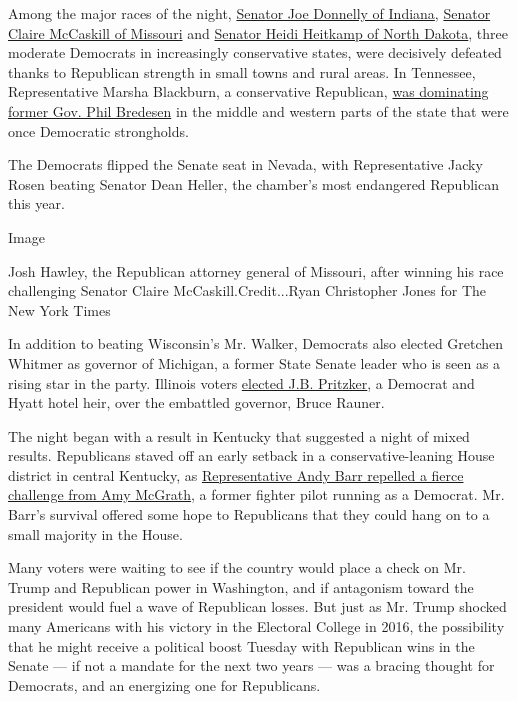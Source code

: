 Among the major races of the night,
\href{https://www.nytimes.com/elections/results/indiana-senate}{Senator
Joe Donnelly of Indiana},
\href{https://www.nytimes.com/2018/11/06/us/politics/josh-hawley-claire-mccaskill-missouri.html}{Senator
Claire McCaskill of Missouri} and
\href{https://www.nytimes.com/2018/11/06/us/politics/heidi-heitkamp-kevin-cramer-north-dakota.html}{Senator
Heidi Heitkamp of North Dakota}, three moderate Democrats in
increasingly conservative states, were decisively defeated thanks to
Republican strength in small towns and rural areas. In Tennessee,
Representative Marsha Blackburn, a conservative Republican,
\href{https://www.nytimes.com/elections/results/tennessee-senate}{was
dominating former Gov. Phil Bredesen} in the middle and western parts of
the state that were once Democratic strongholds.

The Democrats flipped the Senate seat in Nevada, with Representative
Jacky Rosen beating Senator Dean Heller, the chamber's most endangered
Republican this year.

Image

Josh Hawley, the Republican attorney general of Missouri, after winning
his race challenging Senator Claire McCaskill.Credit...Ryan Christopher
Jones for The New York Times

In addition to beating Wisconsin's Mr. Walker, Democrats also elected
Gretchen Whitmer as governor of Michigan, a former State Senate leader
who is seen as a rising star in the party. Illinois voters
\href{https://www.nytimes.com/elections/results/illinois-governor}{elected
J.B. Pritzker}, a Democrat and Hyatt hotel heir, over the embattled
governor, Bruce Rauner.

The night began with a result in Kentucky that suggested a night of
mixed results. Republicans staved off an early setback in a
conservative-leaning House district in central Kentucky, as
\href{https://www.nytimes.com/2018/11/06/us/politics/andy-barr-amy-mcgrath-kentucky.html}{Representative
Andy Barr repelled a fierce challenge from Amy McGrath}, a former
fighter pilot running as a Democrat. Mr. Barr's survival offered some
hope to Republicans that they could hang on to a small majority in the
House.

Many voters were waiting to see if the country would place a check on
Mr. Trump and Republican power in Washington, and if antagonism toward
the president would fuel a wave of Republican losses. But just as Mr.
Trump shocked many Americans with his victory in the Electoral College
in 2016, the possibility that he might receive a political boost Tuesday
with Republican wins in the Senate --- if not a mandate for the next two
years --- was a bracing thought for Democrats, and an energizing one for
Republicans.

